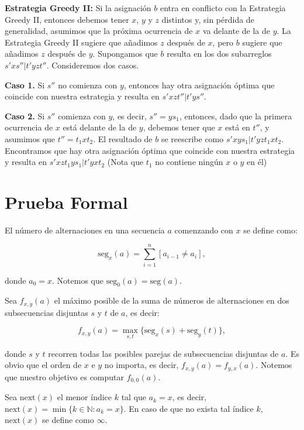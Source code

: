 \documentclass{article}
\begin{document}
\textbf{Estrategia Greedy II:} Si la asignación $b$ entra en conflicto con la Estrategia Greedy II, entonces debemos tener $x$, $y$ y $z$ distintos y, sin pérdida de generalidad, asumimos que la próxima ocurrencia de $x$ va delante de la de $y$. La Estrategia Greedy II sugiere que añadimos $z$ después de $x$, pero $b$ sugiere que añadimos $z$ después de $y$. Supongamos que $b$ resulta en los dos subarreglos $s'xs''| t'yzt''$. Consideremos dos casos.

\textbf{Caso 1.} Si $s''$ no comienza con $y$, entonces hay otra asignación óptima que coincide con nuestra estrategia y resulta en $s'xzt''| t'ys''$.

\textbf{Caso 2.} Si $s''$ comienza con $y$, es decir, $s'' = y s_1$, entonces, dado que la primera ocurrencia de $x$ está delante de la de $y$, debemos tener que $x$ está en $t''$, y asumimos que $t'' = t_1 x t_2$. El resultado de $b$ se reescribe como $s'xy s_1 | t'yzt_1xt_2$. Encontramos que hay otra asignación óptima que coincide con nuestra estrategia y resulta en $s'xzt_1ys_1| t'yxt_2$ (Nota que $t_1$ no contiene ningún $x$ o $y$ en él)








\section{Prueba Formal}

El número de alternaciones en una secuencia $a$ comenzando con $x$ se define como:

$$
\text{seg}_x(a) = \sum_{i=1}^{n} [a_{i-1} \neq a_i],
$$


donde $a_0 = x$. Notemos que $\text{seg}_0(a) = \text{seg}(a)$.

Sea $f_{x,y}(a)$ el máximo posible de la suma de números de alternaciones en dos subsecuencias disjuntas $s$ y $t$ de $a$, es decir:

$$
f_{x,y}(a) = \max_{s,t} \{\text{seg}_x(s) + \text{seg}_y(t)\},
$$


donde $s$ y $t$ recorren todas las posibles parejas de subsecuencias disjuntas de $a$. Es obvio que el orden de $x$ e $y$ no importa, es decir, $f_{x,y}(a) = f_{y,x}(a)$. Notemos que nuestro objetivo es computar $f_{0,0}(a)$.

Sea $\text{next}(x)$ el menor índice $k$ tal que $a_k = x$, es decir, $\text{next}(x) = \min\{k \in \mathbb{N} : a_k = x\}$. En caso de que no exista tal índice $k$, $\text{next}(x)$ se define como $\infty$.
\end{document}
